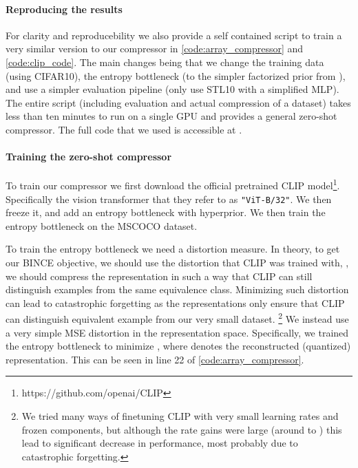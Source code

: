 \documentclass[final]{article}
\begin{document}
\paragraph{Reproducing the results}
For clarity and reproducebility we also provide a self contained script to train a very similar version to our compressor in \cref{code:array_compressor} and \cref{code:clip_code}.
The main changes being that we change the training data (using CIFAR10), the entropy bottleneck (to the simpler factorized prior from \cite{balle_variational_2018}), and use a simpler evaluation pipeline (only use STL10 with a simplified MLP).
The entire script (including evaluation and actual compression of a dataset) takes less than ten minutes to run on a single GPU and provides a general zero-shot compressor.
The full code that we used is accessible at \codeurl{}.

\paragraph{Training the zero-shot compressor}
To train our compressor we first download the official pretrained CLIP model\footnote{https://github.com/openai/CLIP}.
Specifically the vision transformer \cite{dosovitskiy_image_2020} that they refer to as \texttt{"ViT-B/32"}.
We then freeze it, and add an entropy bottleneck with  hyperprior.
We then train the entropy bottleneck on the MSCOCO dataset.

To train the entropy bottleneck we need a distortion measure.
In theory, to get our BINCE objective, we should use the distortion that CLIP was trained with, \ie, we should compress the representation in such a way that CLIP can still distinguish examples from the same equivalence class. Minimizing such distortion can lead to catastrophic forgetting as the representations only ensure that CLIP can distinguish equivalent example from our very small dataset. \footnote{We tried many ways of finetuning CLIP with very small learning rates and frozen components, but although the rate gains were large (around  to ) this lead to significant decrease in performance, most probably due to catastrophic forgetting.}
We instead use a very simple MSE distortion in the representation space.
Specifically, we trained the entropy bottleneck to minimize , where  denotes the reconstructed (quantized) representation.
This can be seen in line 22 of \cref{code:array_compressor}.
\end{document}
